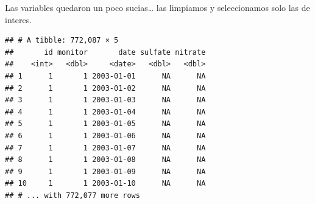 \documentclass[]{article}
\newenvironment{Shaded}{\begin{snugshade}}{\end{snugshade}}
\newcommand{\KeywordTok}[1]{\textcolor[rgb]{0.13,0.29,0.53}{\textbf{#1}}}
\newcommand{\DataTypeTok}[1]{\textcolor[rgb]{0.13,0.29,0.53}{#1}}
\newcommand{\StringTok}[1]{\textcolor[rgb]{0.31,0.60,0.02}{#1}}
\newcommand{\OperatorTok}[1]{\textcolor[rgb]{0.81,0.36,0.00}{\textbf{#1}}}
\newcommand{\NormalTok}[1]{#1}
\begin{document}
Las variables quedaron un poco sucias\ldots{} las limpiamos y
seleccionamos solo las de interes.

\begin{Shaded}
\end{Shaded}

\begin{verbatim}
## # A tibble: 772,087 × 5
##       id monitor       date sulfate nitrate
##    <int>   <dbl>     <date>   <dbl>   <dbl>
## 1      1       1 2003-01-01      NA      NA
## 2      1       1 2003-01-02      NA      NA
## 3      1       1 2003-01-03      NA      NA
## 4      1       1 2003-01-04      NA      NA
## 5      1       1 2003-01-05      NA      NA
## 6      1       1 2003-01-06      NA      NA
## 7      1       1 2003-01-07      NA      NA
## 8      1       1 2003-01-08      NA      NA
## 9      1       1 2003-01-09      NA      NA
## 10     1       1 2003-01-10      NA      NA
## # ... with 772,077 more rows
\end{verbatim}
\end{document}
